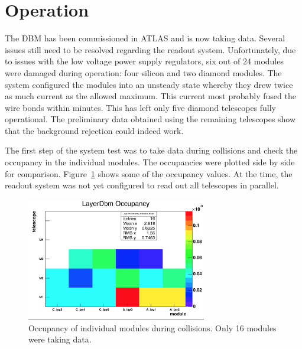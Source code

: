 \section{Operation}
\label{sec:operation}

The DBM has been commissioned in ATLAS and is now taking data. Several issues still need to be resolved regarding the readout system. Unfortunately, due to issues with the low voltage power supply regulators, six out of 24 modules were damaged during operation: four silicon and two diamond modules. The system configured the modules into an unsteady state whereby they drew twice as much current as the allowed maximum. This current most probably fused the wire bonds within minutes. This has left only five diamond telescopes fully operational. The preliminary data obtained using the remaining telescopes show that the background rejection could indeed work. 

The first step of the system test was to take data during collisions and check the occupancy in the individual modules. The occupancies were plotted side by side for comparison. Figure~\ref{fig:collocc} shows some of the occupancy values. At the time, the readout system was not yet configured to read out all telescopes in parallel. 
\begin{figure}[!t]
\centering
\includegraphics[width=0.7\textwidth]{04_charge_monitoring/pics/occupancy}
\caption{Occupancy of individual modules during collisions. Only 16 modules were taking data.}
\label{fig:collocc}
\end{figure}

